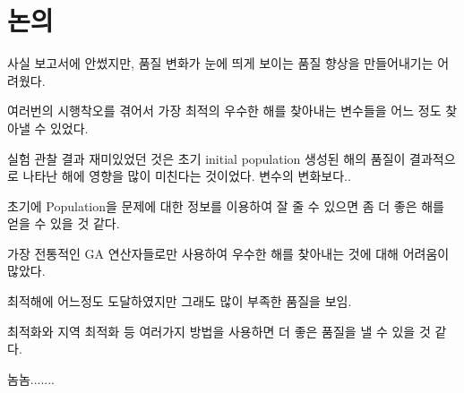\documentclass{article}
\begin{document}
\section{ 논의 }

사실 보고서에 안썼지만, 품질 변화가 눈에 띄게 보이는 품질 향상을 만들어내기는 어려웠다.

여러번의 시행착오를 겪어서 가장 최적의 우수한 해를 찾아내는 변수들을 어느 정도 찾아낼 수 있었다.

실험 관찰 결과 재미있었던 것은 초기 initial population 생성된 해의 품질이 결과적으로 나타난 해에 영향을 많이 미친다는 것이었다. 변수의 변화보다..

초기에 Population을 문제에 대한 정보를 이용하여 잘 줄 수 있으면 좀 더 좋은 해를 얻을 수 있을 것 같다.

가장 전통적인 GA 연산자들로만 사용하여 우수한 해를 찾아내는 것에 대해 어려움이 많았다.

최적해에 어느정도 도달하였지만 그래도 많이 부족한 품질을 보임.

최적화와 지역 최적화 등 여러가지 방법을 사용하면 더 좋은 품질을 낼 수 있을 것 같다.

놈놈.......



\end{document}
